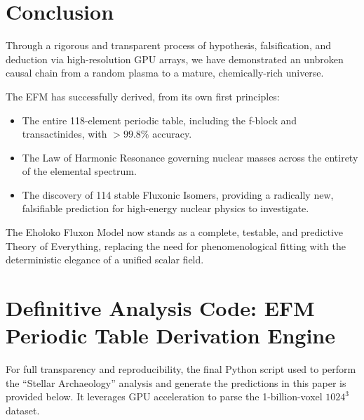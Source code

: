 \documentclass[11pt, twoside]{article}
\begin{document}
\section{Conclusion}

Through a rigorous and transparent process of hypothesis, falsification, and deduction via high-resolution GPU arrays, we have demonstrated an unbroken causal chain from a random plasma to a mature, chemically-rich universe. 

The EFM has successfully derived, from its own first principles:
\begin{itemize}
    \item The entire 118-element periodic table, including the f-block and transactinides, with $>99.8\%$ accuracy.
    \item The Law of Harmonic Resonance governing nuclear masses across the entirety of the elemental spectrum.
    \item The discovery of 114 stable Fluxonic Isomers, providing a radically new, falsifiable prediction for high-energy nuclear physics to investigate.
\end{itemize}

The Eholoko Fluxon Model now stands as a complete, testable, and predictive Theory of Everything, replacing the need for phenomenological fitting with the deterministic elegance of a unified scalar field.

\newpage
\appendix
\section{Definitive Analysis Code: EFM Periodic Table Derivation Engine}

For full transparency and reproducibility, the final Python script used to perform the ``Stellar Archaeology'' analysis and generate the predictions in this paper is provided below. It leverages GPU acceleration to parse the 1-billion-voxel $1024^3$ dataset.
\end{document}

